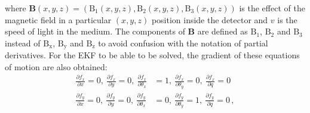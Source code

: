 where $\textbf{B}(x,y,z) = (\operatorname{B_{1}}(x,y,z), \operatorname{B_{2}}(x,y,z), \operatorname{B_{3}}(x,y,z))$ is the effect of the magnetic field in a particular $(x,y,z)$ position inside the detector and $v$ is the speed of light in the medium.
The components of $\textbf{B}$ are defined as $\operatorname{B_{1}}$, $\operatorname{B_{2}}$ and $\operatorname{B_{3}}$ instead of $\operatorname{B_{x}}$, $\operatorname{B_{y}}$ and $\operatorname{B_{z}}$ to avoid confusion with the notation of partial derivatives.
For the EKF to be able to be solved, the gradient of these equations of motion are also obtained:
    \begin{align*}
        \frac{\partial f_x}{\partial x} = 0,~
        \frac{\partial f_x}{\partial y} = 0,~
        \frac{\partial f_x}{\partial \theta_x} &= 1,~
        \frac{\partial f_x}{\partial \theta_y} = 0,~
        \frac{\partial f_x}{\partial q} = 0\\
        \frac{\partial f_y}{\partial x} = 0,~
        \frac{\partial f_y}{\partial y} = 0,~
        \frac{\partial f_y}{\partial \theta_x} &= 0,~
        \frac{\partial f_y}{\partial \theta_y} = 1,~
        \frac{\partial f_y}{\partial q} = 0\,,
    \end{align*}
